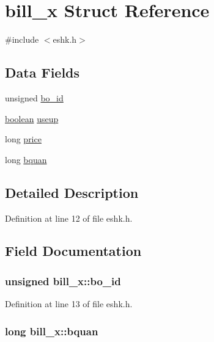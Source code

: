 \hypertarget{structbill__x}{\section{bill\+\_\+x Struct Reference}
\label{structbill__x}
}


{\ttfamily \#include $<$eshk.\+h$>$}

\subsection*{Data Fields}
\begin{DoxyCompactItemize}
\item 
unsigned \hyperlink{structbill__x_a5a2b9b9b78105af4a2efd3f1fc4f60e0}{bo\+\_\+id}
\item 
\hyperlink{global_8h_a531b10dd351aa162d7dcccd1966308b8}{boolean} \hyperlink{structbill__x_ad37f4e566f8bd240e0fa62318788b9a4}{useup}
\item 
long \hyperlink{structbill__x_a7ace451854a7f4ca1a0beffb6f3e1183}{price}
\item 
long \hyperlink{structbill__x_ad9966fc1a9257aeaab65e874e72fbf88}{bquan}
\end{DoxyCompactItemize}


\subsection{Detailed Description}


Definition at line 12 of file eshk.\+h.



\subsection{Field Documentation}
\hypertarget{structbill__x_a5a2b9b9b78105af4a2efd3f1fc4f60e0}{
\subsubsection[{bo\+\_\+id}]{\setlength{\rightskip}{0pt plus 5cm}unsigned bill\+\_\+x\+::bo\+\_\+id}}\label{structbill__x_a5a2b9b9b78105af4a2efd3f1fc4f60e0}


Definition at line 13 of file eshk.\+h.

\hypertarget{structbill__x_ad9966fc1a9257aeaab65e874e72fbf88}{
\subsubsection[{bquan}]{\setlength{\rightskip}{0pt plus 5cm}long bill\+\_\+x\+::bquan}}\label{structbill__x_ad9966fc1a9257aeaab65e874e72fbf88}


